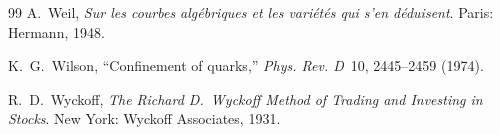 \documentclass[12pt,oneside]{book}
\begin{document}
\begin{thebibliography}{99}
A.~Weil,
\emph{Sur les courbes alg\'ebriques et les vari\'et\'es qui s'en d\'eduisent}.
Paris: Hermann, 1948.


K.~G.~Wilson,
``Confinement of quarks,''
\emph{Phys. Rev. D}\ 10, 2445--2459 (1974).



R.~D.~Wyckoff,
\emph{The Richard D.~Wyckoff Method of Trading and Investing in Stocks}.
New York: Wyckoff Associates, 1931.

\end{thebibliography}
\end{document}
